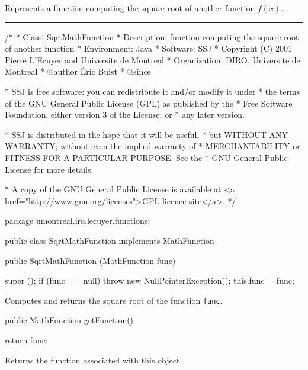 
Represents a function computing
the square root of another function
$f(x)$.

\bigskip\hrule

\begin{code}
\begin{hide}
/*
 * Class:        SqrtMathFunction
 * Description:  function computing the square root of another function
 * Environment:  Java
 * Software:     SSJ 
 * Copyright (C) 2001  Pierre L'Ecuyer and Universite de Montreal
 * Organization: DIRO, Universite de Montreal
 * @author       Éric Buist
 * @since

 * SSJ is free software: you can redistribute it and/or modify it under
 * the terms of the GNU General Public License (GPL) as published by the
 * Free Software Foundation, either version 3 of the License, or
 * any later version.

 * SSJ is distributed in the hope that it will be useful,
 * but WITHOUT ANY WARRANTY; without even the implied warranty of
 * MERCHANTABILITY or FITNESS FOR A PARTICULAR PURPOSE.  See the
 * GNU General Public License for more details.

 * A copy of the GNU General Public License is available at
   <a href="http://www.gnu.org/licenses">GPL licence site</a>.
 */
\end{hide}
package umontreal.iro.lecuyer.functions;\begin{hide}
\end{hide}

public class SqrtMathFunction implements MathFunction\begin{hide} {
   private MathFunction func;
\end{hide}

   public SqrtMathFunction (MathFunction func)\begin{hide} {
      super ();
      if (func == null)
         throw new NullPointerException();
      this.func = func;
   }\end{hide}
\end{code}
\begin{tabb}   Computes and returns the square
 root of the function \texttt{func}.
\end{tabb}
\begin{htmlonly}
\end{htmlonly}
\begin{code}

   public MathFunction getFunction()\begin{hide} {
      return func;
   }\end{hide}
\end{code}
\begin{tabb}   Returns the function associated with
 this object.
\end{tabb}
\begin{htmlonly}
\end{htmlonly}
\begin{code}\begin{hide}

   public double evaluate (double x) {
      return Math.sqrt (func.evaluate (x));
   }
}\end{hide}
\end{code}
